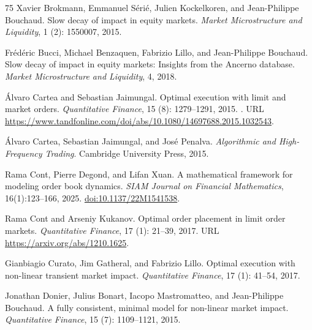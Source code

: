 \documentclass[11pt]{article}
\numberwithin{equation}{section}
\theoremstyle{definition}
\theoremstyle{remark}
\theoremstyle{definition}
\begin{document}
\begin{thebibliography}{75}
Xavier Brokmann, Emmanuel S{\'e}ri{\'e}, Julien Kockelkoren, and Jean-Philippe
  Bouchaud.
\newblock Slow decay of impact in equity markets.
\newblock \emph{Market Microstructure and Liquidity}, 1 (2):
  1550007, 2015.

Fr{\'e}d{\'e}ric Bucci, Michael Benzaquen, Fabrizio Lillo, and Jean-Philippe
  Bouchaud.
\newblock Slow decay of impact in equity markets: Insights from the {A}ncerno
  database.
\newblock \emph{Market Microstructure and Liquidity}, 4, 2018.

{\'A}lvaro Cartea and Sebastian Jaimungal.
\newblock Optimal execution with limit and market orders.
\newblock \emph{Quantitative Finance}, 15 (8): 1279--1291,
  2015.
\newblock {}.
\newblock URL
  \url{https://www.tandfonline.com/doi/abs/10.1080/14697688.2015.1032543}.

{\'A}lvaro Cartea, Sebastian Jaimungal, and Jos{\'e} Penalva.
\newblock \emph{Algorithmic and High-Frequency Trading}.
\newblock Cambridge University Press, 2015.

Rama Cont, Pierre Degond, and Lifan Xuan.
\newblock A mathematical framework for modeling order book dynamics.
\newblock \emph{SIAM Journal on Financial Mathematics}, 16(1):123--166, 2025.
\newblock \href{https://doi.org/10.1137/22M1541538}{doi:10.1137/22M1541538}.

Rama Cont and Arseniy Kukanov.
\newblock Optimal order placement in limit order markets.
\newblock \emph{Quantitative Finance}, 17 (1): 21--39, 2017.
\newblock URL \url{https://arxiv.org/abs/1210.1625}.

Gianbiagio Curato, Jim Gatheral, and Fabrizio Lillo.
\newblock Optimal execution with non-linear transient market impact.
\newblock \emph{Quantitative Finance}, 17 (1): 41--54, 2017.

Jonathan Donier, Julius Bonart, Iacopo Mastromatteo, and Jean-Philippe
  Bouchaud.
\newblock A fully consistent, minimal model for non-linear market impact.
\newblock \emph{Quantitative Finance}, 15 (7): 1109--1121,
  2015.


\end{thebibliography}
\end{document}

